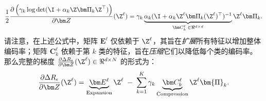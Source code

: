 \documentclass[../../book-main_zh.tex]{subfiles}
\begin{document}
\begin{equation}\label{eqn:compress-directions}
    \frac{1}{2}\frac{\partial \left( \gamma_{k}  \log \det (\I +
    \alpha_{k} \Z \bm \Pi_k \Z^{\top} )  \right)}{\partial \bm
    Z}(\Z^\ell) = \gamma_{k}  \underbrace{ \alpha_{k}  (\I +
    \alpha_{k} \Z^\ell \bm \Pi_k (\Z^\ell)^{\top})^{-1}}_{\bm
    C^{\ell}_k \; \in \Re^{d\times d}} \Z^{\ell} \bm \Pi_k.
\end{equation}
请注意，在上述公式中，矩阵 $\bm E^{\ell}$ 仅依赖于 $\Z^{\ell}$，其旨在{\em 扩展}所有特征以增加整体编码率；矩阵 $\bm C^{\ell}_{k}$ 依赖于第 $k$ 类的特征，旨在{\em 压缩}它们以降低每个类的编码率。
那么完整的梯度 $\frac{\partial \Delta
R_{\epsilon}}{\partial \bm Z}(\Z^\ell) \in \Re^{d\times N}$ 的形式为：
\begin{equation}
    \frac{\partial \Delta R_{\epsilon}}{\partial \bm Z}(\Z^\ell)  =
    \underbrace{\bm E^{\ell}}_{\text{Expansion}} \Z^{\ell} \;-\;
    \sum_{k=1}^K \gamma_{k} \underbrace{\bm
    C_{k}^{\ell}}_{\text{Compression}}  \Z^{\ell} \bm{\Pi}_k.
    \label{eqn:DR-gradient}
\end{equation}
\end{document}

